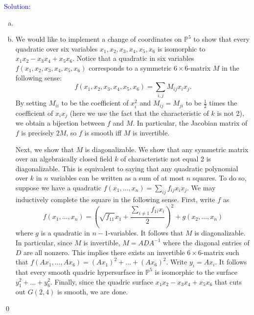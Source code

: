 \documentclass[11pt]{article}
\newcommand{\PP}{\mathbb{P}}
\newenvironment{solution}{\begin{trivlist}\item[]{\textcolor{blue}{Solution:}}}{\qed \end{trivlist}}
\begin{document}
\begin{solution}
\begin{enumerate}[(a)]
	\item 
	
	\item We would like to implement a change of coordinates on $\PP^5$ to show that every quadratic over six variables $x_1, x_2, x_3, x_4, x_5, x_6$ is isomorphic to $x_1x_2 - x_3x_4 + x_5x_6$. Notice that a quadratic in six variables $f(x_1, x_2, x_3, x_4, x_5, x_6)$ corresponds to a symmetric $6 \times 6$-matrix $M$ in the following sense:
	\begin{equation*}
		f(x_1, x_2, x_3, x_4, x_5, x_6) = \sum_{i, j} M_{ij} x_i x_j.
	\end{equation*}
	By setting $M_{ii}$ to be the coefficient of $x_i^2$ and $M_{ij} = M_{ji}$ to be $\frac{1}{2}$ times the coefficient of $x_ix_j$ (here we use the fact that the characteristic of $k$ is not 2), we obtain a bijection between $f$ and $M$. In particular, the Jacobian matrix of $f$ is precisely $2M$, so $f$ is smooth iff $M$ is invertible. 

	Next, we show that $M$ is diagonalizable. We show that any symmetric matrix over an algebraically closed field $k$ of characteristic not equal 2 is diagonalizable. This is equivalent to saying that any quadratic polynomial over $k$ in $n$ variables can be written as a sum of at most $n$ squares. To do so, suppose we have a quadratic $f(x_1, \ldots, x_n) = \sum_{ij} f_{ij} x_ix_j$. We may inductively complete the square in the following sense. First, write $f$ as 
	\begin{equation*}
		f(x_1, \ldots, x_n)
		= \left( \sqrt{f_{11}} x_1 + \frac{\sum_{i \neq 1} f_{1i} x_i}{2} \right)^2 + g(x_2, \ldots, x_n)
	\end{equation*}
	where $g$ is a quadratic in $n-1$-variables. It follows that $M$ is diagonalizable. In particular, since $M$ is invertible, $M = ADA^{-1}$ where the diagonal entries of $D$ are all nonzero. This implies there exists an invertible $6 \times 6$-matrix such that $f(Ax_1, \ldots, Ax_6) = (Ax_1)^2 + \ldots + (Ax_6)^2$. Write $y_i = Ax_i$. It follows that every smooth quadric hypersurface in $\PP^5$ is isomorphic to the surface $y_1^2 + \ldots + y_6^2$. Finally, since the quadric surface $x_1x_2 - x_3x_4 + x_5x_6$ that cuts out $G(2,4)$ is smooth, we are done.
\end{enumerate}
\end{solution}

\newpage
\end{document}
